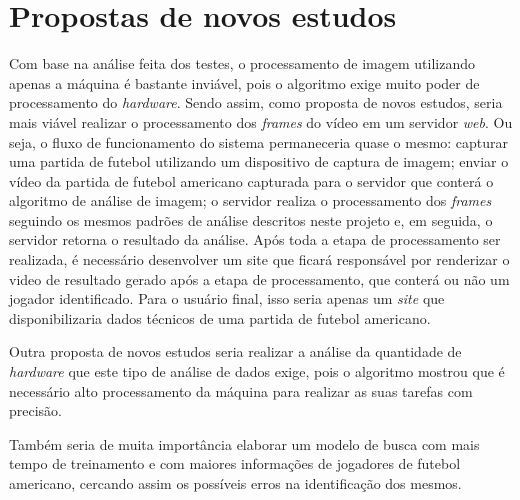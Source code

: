 \section{\textbf{Propostas de novos estudos}}
\label{novos_estudos}

Com base na análise feita dos testes, o processamento de imagem utilizando apenas a máquina é bastante inviável, pois o algoritmo exige muito poder de processamento do \textit{hardware}. Sendo assim, como proposta de novos estudos, seria mais viável realizar o processamento dos \textit{frames} do vídeo em um servidor \textit{web}. Ou seja,  o fluxo de funcionamento do sistema permaneceria quase o mesmo: capturar uma partida de futebol utilizando um dispositivo de captura de imagem; enviar o vídeo da partida de futebol americano capturada para o servidor que conterá o algoritmo de análise de imagem; o servidor realiza o processamento dos \textit{frames} seguindo os mesmos padrões de análise descritos neste projeto e, em seguida, o servidor retorna o resultado da análise. Após toda a etapa de processamento ser realizada, é necessário desenvolver um site que ficará responsável por renderizar o video de resultado gerado após a etapa de processamento, que conterá ou não um jogador identificado. Para o usuário final, isso seria apenas um \textit{site} que disponibilizaria dados técnicos de uma partida de futebol americano.

Outra proposta de novos estudos seria realizar a análise da quantidade de \textit{hardware} que este tipo de análise de dados exige, pois o algoritmo mostrou que é necessário alto processamento da máquina para realizar as suas tarefas com precisão.

Também seria de muita importância elaborar um modelo de busca com mais tempo de treinamento e com maiores informações de jogadores de futebol americano, cercando assim os possíveis erros na identificação dos mesmos.